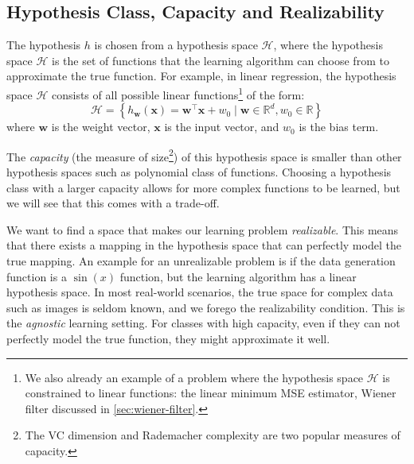 \subsection{Hypothesis Class, Capacity and Realizability}
The hypothesis $h$ is chosen from a hypothesis space $\mathcal{H}$, where the hypothesis space $\mathcal{H}$ is the set of functions that the learning algorithm can choose from to approximate the true function. 
For example, in linear regression, the hypothesis space $\mathcal{H}$ consists of all possible  linear functions\footnote{We also already an example of a problem where the hypothesis space $\mathcal{H}$ is constrained to linear functions: the linear minimum \gls{MSE} estimator, Wiener filter discussed in \cref{sec:wiener-filter}.} of the form:
\begin{equation}\label{eq:linear-hypothesis}
   \mathcal{H} =  \left\{ h_{\mathbf{w}}(\mathbf{x}) = \mathbf{w}^\top \mathbf{x} + w_0 \mid \mathbf{w} \in \mathbb{R}^d, w_0 \in \mathbb{R} \right\}
\end{equation}
where $\mathbf{w}$ is the weight vector, $\mathbf{x}$ is the input vector, and $w_0$ is the bias term. 

The \textit{capacity} (the measure of size\footnote{The VC dimension and Rademacher complexity are two popular measures of capacity.}) of this hypothesis space is smaller than other  hypothesis spaces such as polynomial class of functions. Choosing a hypothesis class with a larger capacity allows for more complex functions to be learned, but we will see that this comes with a trade-off.

We want to find a space that makes our learning problem \textit{realizable}. This means that there exists a mapping  in the hypothesis space that can perfectly model the true mapping. An example for an unrealizable problem is if the data generation function is a $\sin(x)$ function, but the learning algorithm has a linear hypothesis space. In most real-world scenarios, the true space for complex data such as images is seldom known, and we forego the realizability condition. This is the \textit{agnostic} learning setting. For classes with high capacity, even if they can not perfectly model the true function, they might approximate it well.

